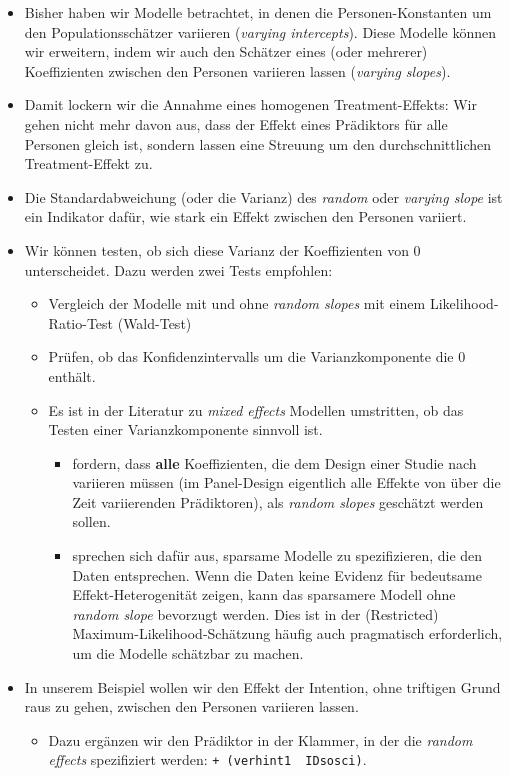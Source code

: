 \documentclass[
]{book}
\providecommand{\tightlist}{%
  \setlength{\itemsep}{0pt}\setlength{\parskip}{0pt}}
\begin{document}
\begin{itemize}
\tightlist
\item
  Bisher haben wir Modelle betrachtet, in denen die Personen-Konstanten um den Populationsschätzer variieren (\emph{varying intercepts}). Diese Modelle können wir erweitern, indem wir auch den Schätzer eines (oder mehrerer) Koeffizienten zwischen den Personen variieren lassen (\emph{varying slopes}).
\item
  Damit lockern wir die Annahme eines homogenen Treatment-Effekts: Wir gehen nicht mehr davon aus, dass der Effekt eines Prädiktors für alle Personen gleich ist, sondern lassen eine Streuung um den durchschnittlichen Treatment-Effekt zu.
\item
  Die Standardabweichung (oder die Varianz) des \emph{random} oder \emph{varying slope} ist ein Indikator dafür, wie stark ein Effekt zwischen den Personen variiert.
\item
  Wir können testen, ob sich diese Varianz der Koeffizienten von 0 unterscheidet. Dazu werden zwei Tests empfohlen:

  \begin{itemize}
  \tightlist
  \item
    Vergleich der Modelle mit und ohne \emph{random slopes} mit einem Likelihood-Ratio-Test (Wald-Test)
  \item
    Prüfen, ob das Konfidenzintervalls um die Varianzkomponente die 0 enthält.
  \item
    Es ist in der Literatur zu \emph{mixed effects} Modellen umstritten, ob das Testen einer Varianzkomponente sinnvoll ist.

    \begin{itemize}
    \tightlist
    \item
      \citet{barrRandomEffectsStructure2013} fordern, dass \textbf{alle} Koeffizienten, die dem Design einer Studie nach variieren müssen (im Panel-Design eigentlich alle Effekte von über die Zeit variierenden Prädiktoren), als \emph{random slopes} geschätzt werden sollen.
    \item
      \citet{matuschekBalancingTypeError2017} sprechen sich dafür aus, sparsame Modelle zu spezifizieren, die den Daten entsprechen. Wenn die Daten keine Evidenz für bedeutsame Effekt-Heterogenität zeigen, kann das sparsamere Modell ohne \emph{random slope} bevorzugt werden. Dies ist in der (Restricted) Maximum-Likelihood-Schätzung häufig auch pragmatisch erforderlich, um die Modelle schätzbar zu machen.
    \end{itemize}
  \end{itemize}
\item
  In unserem Beispiel wollen wir den Effekt der Intention, ohne triftigen Grund raus zu gehen, zwischen den Personen variieren lassen.

  \begin{itemize}
  \tightlist
  \item
    Dazu ergänzen wir den Prädiktor in der Klammer, in der die \emph{random effects} spezifiziert werden: \texttt{+\ (verhint1\ \textbar{}\ IDsosci)}.
  \end{itemize}
\end{itemize}
\end{document}
